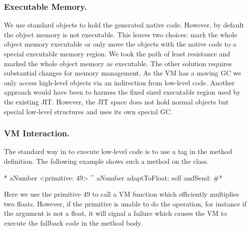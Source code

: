 \subsubsection{Executable Memory.}
 
We use standard \ST objects to hold the generated native code.
However, by default the object memory is not executable.
This leaves two choices: mark the whole object memory executable or only move the objects with the native code to a special executable memory region.
We took the path of least resistance and marked the whole object memory as executable.
The other solution requires substantial changes for memory management. As the VM has a moving GC we only access high-level \ST objects via an indirection from low-level code.
Another approach would have been to harness the fixed sized executable region used by the existing JIT.
However, the JIT space does not hold normal \ST objects but special low-level structures and uses its own special GC. 

\subsubsection{VM Interaction.}

The standard way in \ST to execute low-level code is to use a tag in the method definition. The following example shows such a method on the  class.
%
\begin{stcode}[label={lst:basic-primitive}]{5}
* aNumber 
	<primitive: 49>
	^ aNumber adaptToFloat: self andSend: #*
\end{stcode}
%
Here we use the primitive 49 to call a VM function which efficiently multiplies two floats. 
However, if the primitive is unable to do the operation, for instance if the argument  is not a float, it will signal a failure which causes the VM to execute the fallback \ST code in the method body.  



